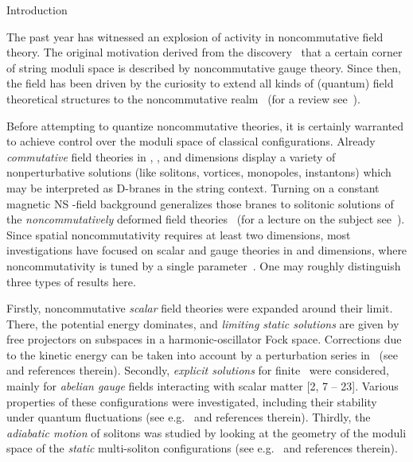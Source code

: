 \documentclass[a4paper,11pt]{article}
\makeatletter
\renewcommand{\section}{\@startsection{section}{1}{0pt}{\medskipamount}
{\medskipamount}{\large\bf}}
\numberwithin{equation}{section}
\def\th{\theta}
\makeatother
\begin{document}
\section{Introduction}

\noindent
The past year has witnessed an explosion of activity in noncommutative
field theory. The original motivation derived from the discovery~\cite{seiberg}
that a certain corner of string moduli space is described by noncommutative
gauge theory. Since then, the field has been driven by the curiosity
to extend all kinds of (quantum) field theoretical structures to the
noncommutative realm~\cite{gopa} (for a review see~\cite{douglas}).

Before attempting to quantize noncommutative theories, it is certainly
warranted to achieve control over the moduli space of classical configurations.
Already {\it commutative\/} field theories in \coordHE{}, \coordHE{}, and \coordHE{}
dimensions display a variety of nonperturbative solutions (like solitons,
vortices, monopoles, instantons) which may be interpreted as D-branes in the
string context. Turning on a constant magnetic NS \coordHE{}-field background
generalizes those branes to solitonic solutions of the {\it noncommutatively\/}
deformed field theories~\cite{dasgupta,martinec} (for a lecture on the subject
see~\cite{komaba}).
Since spatial noncommutativity requires at least two dimensions, most
investigations have focused on scalar and gauge theories in \coordHE{} and \coordHE{}
dimensions, where noncommutativity is tuned by a single parameter~\myHighlight{$\th$}\coordHE{}.
One may roughly distinguish three types of results here.

Firstly, noncommutative {\it scalar\/} field theories were expanded around
their \myHighlight{$\th{\to}\infty$}\coordHE{} limit. There, the potential energy dominates, and
{\it limiting static solutions\/} are given by free projectors on subspaces
in a harmonic-oscillator Fock space. Corrections due to the kinetic energy can
be taken into account by a perturbation series in~\myHighlight{$1/\th$}\coordHE{}
(see~\cite{gopa,jatkar,gopa2,rocek} and references therein).
Secondly, {\it explicit solutions\/} for finite~\myHighlight{$\th$}\coordHE{} were considered,
mainly for {\it abelian gauge\/} fields interacting with scalar matter
[2, 7 -- 23].  %
Various properties of these configurations were investigated, including
their stability under quantum fluctuations
(see e.g.~\cite{aga,gross3,jackson} and references therein).
Thirdly, the {\it adiabatic motion\/} of solitons was studied by looking
at the geometry of the moduli space of the {\it static\/} multi-soliton
configurations (see e.g.~\cite{gopa2,rocek,araki} and references therein).
\end{document}
